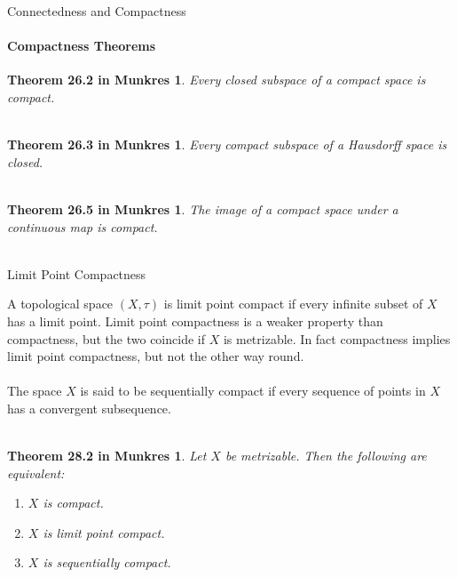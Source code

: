 \documentclass[pdf]{beamer}
\begin{document}
    \begin{frame}{Connectedness and Compactness}
        \framesubtitle{Compactness Theorems}
        \newtheorem{thrm:closedSub}{Theorem 26.2 in Munkres}
        \newtheorem{thrm:closedComp}{Theorem 26.3 in Munkres}
        \newtheorem{thrm:imageComp}{Theorem 26.5 in Munkres}

        \begin{thrm:closedSub}
            Every closed subspace of a compact space is compact. \\~\\
        \end{thrm:closedSub}

        \begin{thrm:closedComp}
            Every compact subspace of a Hausdorff space is closed. \\~\\
        \end{thrm:closedComp}

        \begin{thrm:imageComp}
            The image of a compact space under a continuous map is compact. \\~\\
        \end{thrm:imageComp}

    \end{frame}

    \begin{frame}{Limit Point Compactness}
        \newtheorem{thrm:seqComp}{Theorem 28.2 in Munkres}

        A topological space $(X, \tau)$ is {\color{red} limit point compact} if every
        infinite subset of $X$ has a limit point. Limit point compactness is a weaker
        property than compactness, but the two coincide if $X$ is metrizable. In fact
        compactness implies limit point compactness, but not the other way round. \\~\\

        The space $X$ is said to be {\color{red} sequentially compact} if every sequence
        of points in $X$ has a convergent subsequence. \\~\\

        \begin{thrm:seqComp}
            Let $X$ be metrizable. Then the following are equivalent:
            \begin{enumerate}
                \item $X$ is compact.
                \item $X$ is limit point compact.
                \item $X$ is sequentially compact.
            \end{enumerate}
        \end{thrm:seqComp}
        
    \end{frame}
\end{document}
